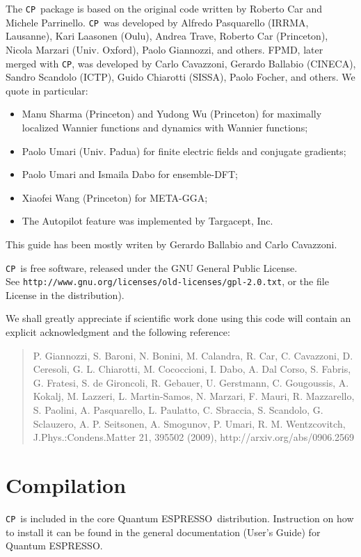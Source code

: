 \documentclass[12pt,a4paper]{article}
\def\qe{{\sc Quantum ESPRESSO}}
\def\CP{\texttt{CP}}
\begin{document}
The \CP\ package is based on the original code written by
 Roberto Car
and Michele Parrinello. \CP\ was developed by Alfredo Pasquarello
(IRRMA, Lausanne), Kari Laasonen (Oulu), Andrea Trave, Roberto
Car (Princeton), Nicola Marzari (Univ. Oxford), Paolo Giannozzi, and others.
FPMD, later merged with \CP, was developed by Carlo
Cavazzoni, 
Gerardo Ballabio (CINECA), Sandro Scandolo (ICTP), 
Guido Chiarotti (SISSA), Paolo Focher, and others.
We quote in particular:
\begin{itemize}
  \item Manu Sharma (Princeton) and Yudong Wu (Princeton) for
   maximally localized Wannier functions and dynamics with 
   Wannier functions;
  \item Paolo Umari (Univ. Padua) for finite electric fields and conjugate
   gradients;
  \item Paolo Umari and Ismaila Dabo for ensemble-DFT;
  \item Xiaofei Wang (Princeton) for META-GGA;
  \item The Autopilot feature was implemented by Targacept, Inc.
\end{itemize}
This guide has been mostly writen by Gerardo Ballabio and Carlo Cavazzoni.

\CP\ is free software, released under the
GNU General Public License. \\ See
\texttt{http://www.gnu.org/licenses/old-licenses/gpl-2.0.txt},
or the file License in the distribution).

We shall greatly appreciate if scientific work done using this code will
contain an explicit acknowledgment and the following reference:
\begin{quote}
P. Giannozzi, S. Baroni, N. Bonini, M. Calandra, R. Car, C. Cavazzoni,
D. Ceresoli, G. L. Chiarotti, M. Cococcioni, I. Dabo, A. Dal Corso,
S. Fabris, G. Fratesi, S. de Gironcoli, R. Gebauer, U. Gerstmann,
C. Gougoussis, A. Kokalj, M. Lazzeri, L. Martin-Samos, N. Marzari,
F. Mauri, R. Mazzarello, S. Paolini, A. Pasquarello, L. Paulatto,
C. Sbraccia, S. Scandolo, G. Sclauzero, A. P. Seitsonen, A. Smogunov,
P. Umari, R. M. Wentzcovitch, J.Phys.:Condens.Matter 21, 395502 (2009),
http://arxiv.org/abs/0906.2569
\end{quote}

\section{Compilation}

\CP\ is included in the core \qe\ distribution.
Instruction on how to install it can be found in the
general documentation (User's Guide) for \qe.
\end{document}
